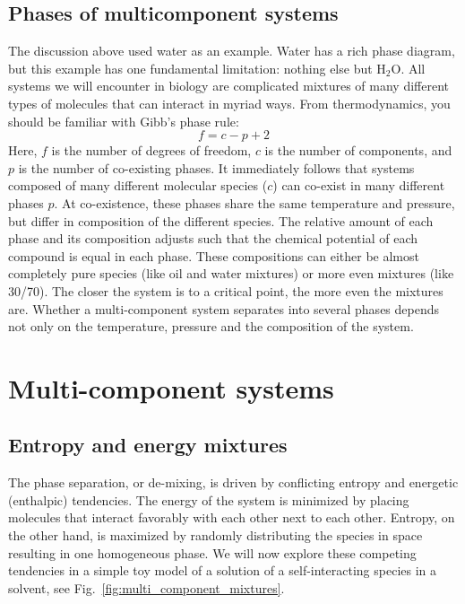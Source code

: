 \subsection*{Phases of multicomponent systems}
The discussion above used water as an example.
Water has a rich phase diagram, but this example has one fundamental limitation: nothing else but $\mathrm{H_2 O}$.
All systems we will encounter in biology are complicated mixtures of many different types of molecules that can interact in myriad ways.
From thermodynamics, you should be familiar with Gibb's phase rule:
\begin{equation}
	f = c - p + 2
\end{equation}
Here, $f$ is the number of degrees of freedom, $c$ is the number of components, and $p$ is the number of co-existing phases.
It immediately follows that systems composed of many different molecular species ($c$) can co-exist in many different phases $p$.
At co-existence, these phases share the same temperature and pressure, but differ in composition of the different species.
The relative amount of each phase and its composition adjusts such that the chemical potential of each compound is equal in each phase.
These compositions can either be almost completely pure species (like oil and water mixtures) or more even mixtures (like 30/70).
The closer the system is to a critical point, the more even the mixtures are.
Whether a multi-component system separates into several phases depends not only on the temperature, pressure and the composition of the system.


\section{Multi-component systems}

\subsection*{Entropy and energy mixtures}
The phase separation, or de-mixing, is driven by conflicting entropy and energetic (enthalpic) tendencies.
The energy of the system is minimized by placing molecules that interact  favorably with each other next to each other.
Entropy, on the other hand, is maximized by randomly distributing the species in space resulting in one homogeneous phase.
We will now explore these competing tendencies in a simple toy model of a solution of a self-interacting species in a solvent, see Fig.~\ref{fig:multi_component_mixtures}.


